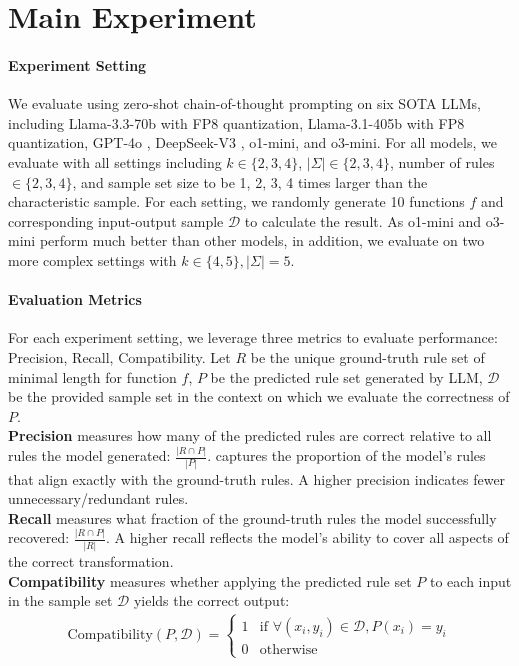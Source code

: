 \section{Main Experiment}
\paragraph{Experiment Setting} We evaluate using zero-shot chain-of-thought prompting on six SOTA LLMs, including Llama-3.3-70b \citep{dubey2024llama} with FP8 quantization, Llama-3.1-405b with FP8 quantization, GPT-4o \citep{hurst2024gpt}, DeepSeek-V3 \citep{liu2024deepseek}, o1-mini\citep{jaech2024openai}, and o3-mini. For all models, we evaluate with all settings including $k\in\{2, 3, 4\}$, $|\Sigma|\in\{2, 3, 4\}$, number of rules $\in\{2, 3, 4\}$, and sample set size to be 1, 2, 3, 4 times larger than the characteristic sample. For each setting, we randomly generate 10 functions $f$ and corresponding input-output sample $\mathcal{D}$ to calculate the result. As o1-mini and o3-mini perform much better than other models, in addition, we evaluate on two more complex settings with $k\in\{4, 5\}, |\Sigma| = 5$.

\paragraph{Evaluation Metrics}
For each experiment setting, we leverage three metrics to evaluate performance: Precision, Recall, Compatibility. Let $R$ be the unique ground-truth rule set of minimal length for function $f$, $P$ be the predicted rule set generated by LLM, $\mathcal{D}$ be the provided sample set in the context on which we evaluate the correctness of $P$. \\
\textbf{Precision} measures how many of the predicted rules are correct relative to all rules the model generated: $\frac{|R\cap P|}{|P|}$. captures the proportion of the model's rules that align exactly with the ground-truth rules. A higher precision indicates fewer unnecessary/redundant rules.\\
\textbf{Recall} measures what fraction of the ground-truth rules the model successfully recovered: $\frac{|R\cap P|}{|R|}$. A higher recall reflects the model's ability to cover all aspects of the correct transformation.\\
\textbf{Compatibility} measures whether applying the predicted rule set $P$ to each input in the sample set $\mathcal{D}$ yields the correct output:
\begin{align*} 
\text{Compatibility}(P, \mathcal{D}) = 
\begin{cases} 
1 & \text{if } \forall (x_i, y_i)\in \mathcal{D}, P(x_i) = y_i\\
0 & \text{otherwise}
\end{cases} 
\end{align*}

